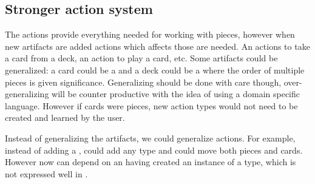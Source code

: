 \subsection{Stronger action system}
\label{sec:strongeractionsystem}

The actions provide everything needed for working with pieces, however when new artifacts are added actions which affects those are needed. An actions to take a card from a deck, an action to play a card, etc. Some artifacts could be generalized: a card could be a  and a deck could be a  where the order of multiple pieces is given significance. Generalizing should be done with care though, over-generalizing will be counter productive with the idea of using a domain specific language. However if cards were pieces, new action types would not need to be created and learned by the user.

Instead of generalizing the artifacts, we could generalize actions. For example, instead of  adding a ,  could add any type and  could move both pieces and cards. However now  can depend on an  having created an instance of a type, which is not expressed well in .
